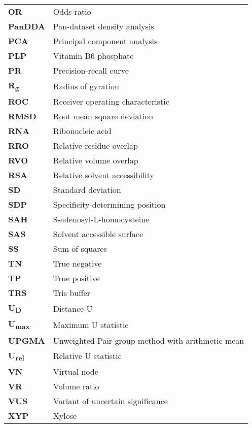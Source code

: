 \begin{longtable}[l]{@{}p{2.5cm}p{12cm}@{}}
\textbf{OR} & Odds ratio \\
\textbf{PanDDA} & Pan-dataset density analysis \\
\textbf{PCA} & Principal component analysis \\
\textbf{PLP} & Vitamin B6 phosphate \\
\textbf{PR} & Precision-recall curve \\
\textbf{R\textsubscript{g}} & Radius of gyration \\
\textbf{ROC} & Receiver operating characteristic \\
\textbf{RMSD} & Root mean square deviation \\
\textbf{RNA} & Ribonucleic acid \\
\textbf{RRO} & Relative residue overlap \\
\textbf{RVO} & Relative volume overlap \\
\textbf{RSA} & Relative solvent accessibility \\
\textbf{SD} & Standard deviation \\
\textbf{SDP} & Specificity-determining position \\
\textbf{SAH} & S-adenosyl-L-homocysteine \\
\textbf{SAS} & Solvent accessible surface \\
\textbf{SS} & Sum of squares \\
\textbf{TN} & True negative \\
\textbf{TP} & True positive \\
\textbf{TRS} & Tris buffer \\
\textbf{U\textsubscript{D}} & Distance U \\
\textbf{U\textsubscript{max}} & Maximum U statistic \\
\textbf{UPGMA} & Unweighted Pair-group method with arithmetic mean \\
\textbf{U\textsubscript{rel}} & Relative U statistic \\
\textbf{VN} & Virtual node \\
\textbf{VR} & Volume ratio \\
\textbf{VUS} & Variant of uncertain significance \\
\textbf{XYP} & Xylose \\

\end{longtable}
